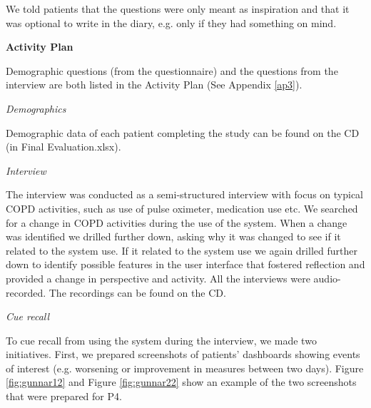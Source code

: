 We told patients that the questions were only meant as inspiration and that it was optional to write in the diary, e.g. only if they had something on mind.

\textbf{Activity Plan}

Demographic questions (from the questionnaire) and the questions from the interview are both listed in the Activity Plan (See Appendix \ref{ap3}).

\textit{Demographics}

Demographic data of each patient completing the study can be found on the CD (in Final Evaluation.xlsx).

\textit{Interview}

The interview was conducted as a semi-structured interview with focus on typical COPD activities, such as use of pulse oximeter, medication use etc. We searched for a change in COPD activities during the use of the system. When a change was identified we drilled further down, asking why it was changed to see if it related to the system use. If it related to the system use we again drilled further down to identify possible features in the user interface that fostered reflection and provided a change in perspective and activity. All the interviews were audio-recorded. The recordings can be found on the CD.

\textit{Cue recall}

To cue recall from using the system during the interview, we made two initiatives. First, we prepared screenshots of patients' dashboards showing events of interest (e.g. worsening or improvement in measures between two days). Figure \ref{fig:gunnar12} and Figure \ref{fig:gunnar22} show an example of the two screenshots that were prepared for P4. 

